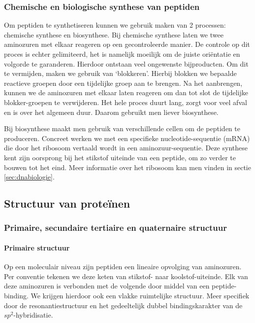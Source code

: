 \documentclass[a4paper,kul]{kulakarticle} %
\begin{document}
\subsubsection{Chemische en biologische synthese van peptiden}
Om peptiden te synthetiseren kunnen we gebruik maken van 2 processen: chemische synthese en biosynthese. Bij chemische synthese laten we twee aminozuren met elkaar reageren op een gecontroleerde manier. De controle op dit proces is echter gelimiteerd, het is namelijk moeilijk om de juiste oriëntatie en volgorde te garanderen. Hierdoor ontstaan veel ongewenste bijproducten. Om dit te vermijden, maken we gebruik van `blokkeren'. Hierbij blokken we bepaalde reactieve groepen door een tijdelijke groep aan te brengen. Na het aanbrengen, kunnen we de aminozuren met elkaar laten reageren om dan tot slot de tijdelijke blokker-groepen te verwijderen. Het hele proces duurt lang, zorgt voor veel afval en is over het algemeen duur. Daarom gebruikt men liever biosynthese.

Bij biosynthese maakt men gebruik van verschillende cellen om de peptiden te produceren. Concreet werken we met een specifieke nucleotide-sequentie (mRNA) die door het ribosoom vertaald wordt in een aminozuur-sequentie. Deze synthese kent zijn oorsprong bij het stikstof uiteinde van een peptide, om zo verder te bouwen tot het eind. Meer informatie over het ribosoom kan men vinden in sectie \ref{sec:dnabiologie}.
\newpage
\subsection{Structuur van proteïnen}
\subsubsection{Primaire, secundaire tertiaire en quaternaire structuur}
\paragraph{Primaire structuur}
Op een moleculair niveau zijn peptiden een lineaire opvolging van aminozuren. Per conventie tekenen we deze keten van stikstof- naar koolstof-uiteinde. Elk van deze aminozuren is verbonden met de volgende door middel van een peptide-binding. We krijgen hierdoor ook een vlakke ruimtelijke structuur. Meer specifiek door de resonantiestructuur en het gedeeltelijk dubbel bindingskarakter van de $sp^2$-hybridisatie. 
\end{document}

